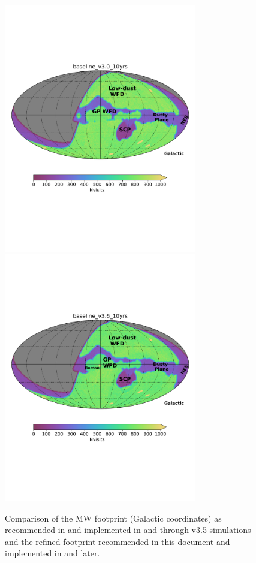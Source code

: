 \begin{figure}
\centering
    \includegraphics[width=0.75\textwidth]{figures/baseline_v3.0_10yrs_nvisits_galactic.pdf}
    \includegraphics[width=0.75\textwidth]{figures/baseline_v3.6_10yrs_nvisits_galactic.pdf}
    \caption{Comparison of the MW footprint (Galactic coordinates) as recommended in  and implemented in  and through v3.5 simulations and the refined footprint recommended in this document and implemented in  and later.}
\end{figure}

